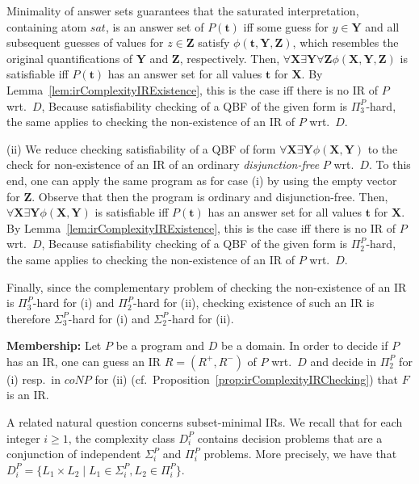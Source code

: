 \documentclass[11pt,fleqn,twoside]{article}
\renewcommand{\vec}[1]{\ensuremath{\mb{#1}}}
\newcommand{\mb}[1]{\ensuremath{\mathbf{#1}}}
\begin{document}
{					Minimality of answer sets guarantees that the saturated interpretation, containing atom $\mathit{sat}$,
					is an answer set of $P(\vec{t})$ iff some guess for $y \in \vec{Y}$ and all subsequent guesses of values for $z \in \vec{Z}$
					satisfy $\phi(\vec{t}, \vec{Y}, \vec{Z})$, which resembles the original quantifications of $\vec{Y}$ and $\vec{Z}$,
					respectively.
					Then, $\forall \vec{X} \exists \vec{Y} \forall \vec{Z} \phi(\vec{X}, \vec{Y}, \vec{Z})$
					is satisfiable iff $P(\vec{t})$ has an answer set for all values $\vec{t}$ for $\vec{X}$.
					By Lemma~\ref{lem:irComplexityIRExistence}, this is the case iff there is no IR of $P$ wrt.~$D$,
					Because satisfiability checking of a QBF of the given form is $\Pi^P_3$-hard, the same applies to checking the non-existence of an IR of $P$ wrt.~$D$.

					(ii) We reduce checking satisfiability of a QBF
					of form $\forall \vec{X} \exists \vec{Y} \phi(\vec{X}, \vec{Y})$
					to the check for non-existence of an IR of an ordinary \emph{disjunction-free} $P$ wrt.~$D$.
					To this end, one can apply the same program as for case (i) by using the empty vector for $\vec{Z}$.
					Observe that then the program is ordinary and disjunction-free.
					Then, $\forall \vec{X} \exists \vec{Y} \phi(\vec{X}, \vec{Y})$
					is satisfiable iff $P(\vec{t})$ has an answer set for all values $\vec{t}$ for $\vec{X}$.
					By Lemma~\ref{lem:irComplexityIRExistence}, this is the case iff there is no IR of $P$ wrt.~$D$,
					Because satisfiability checking of a QBF of the given form is $\Pi^P_2$-hard, the same applies to checking the non-existence of an IR of $P$ wrt.~$D$.

					Finally, since the complementary problem of checking the non-existence of an IR is $\Pi^P_3$-hard for (i) and $\Pi^P_2$-hard for (ii),
					checking existence of such an IR is therefore $\Sigma^P_3$-hard for (i) and $\Sigma^P_2$-hard for (ii).

				\noindent\textbf{Membership:}
					Let $P$ be a program and $D$ be a domain.
					In order to decide if $P$ has an IR, one can
					guess an IR $R = (R^{+}, R^{-})$ of $P$ wrt.~$D$
					and decide in $\Pi^P_2$ for (i) resp.~in $\mathit{coNP}$ for (ii) (cf.~Proposition~\ref{prop:irComplexityIRChecking})
					that $F$ is an IR.
			}

			A related natural question concerns subset-minimal IRs.
			We recall that for each integer $i \ge 1$, the complexity class $D^P_i$ contains decision problems
			that are a conjunction of independent $\Sigma^P_i$ and $\Pi^P_i$ problems.
			More precisely, we have that $D^P_i = \{ L_1 \times L_2 \mid L_1 \in \Sigma^P_i, L_2 \in \Pi^P_i \}$.
\end{document}
